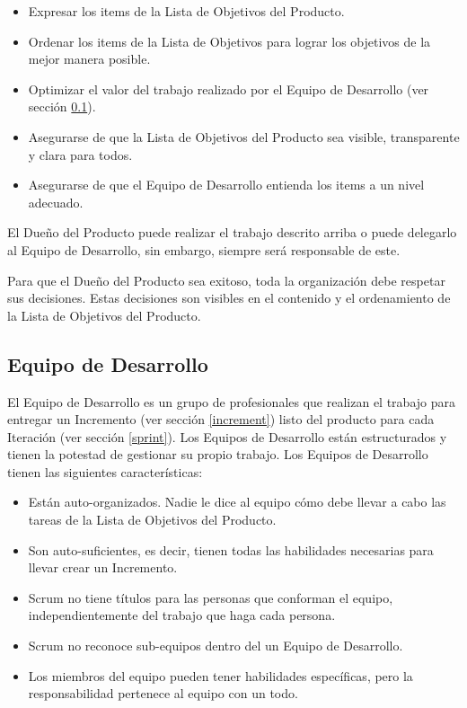 \begin{itemize}
    \item Expresar los items de la Lista de Objetivos del Producto.
    \item Ordenar los items de la Lista de Objetivos para lograr los objetivos de la mejor manera posible.
    \item Optimizar el valor del trabajo realizado por el Equipo de Desarrollo (ver sección \ref{developmentTeam}).
    \item Asegurarse de que la Lista de Objetivos del Producto sea visible, transparente y clara para todos.
    \item Asegurarse de que el Equipo de Desarrollo entienda los items a un nivel adecuado.
\end{itemize}

El Dueño del Producto puede realizar el trabajo descrito arriba o puede delegarlo al Equipo de Desarrollo, sin embargo, siempre será responsable de este.

Para que el Dueño del Producto sea exitoso, toda la organización debe respetar sus decisiones. Estas decisiones son visibles en el contenido y el ordenamiento de la Lista de Objetivos del Producto. \cite{scrumSchwaber}

\subsection{Equipo de Desarrollo} \label{developmentTeam}
El Equipo de Desarrollo es un grupo de profesionales que realizan el trabajo para entregar un Incremento (ver sección \ref{increment}) listo del producto para cada Iteración (ver sección \ref{sprint}). Los Equipos de Desarrollo están estructurados y tienen la potestad de gestionar su propio trabajo. Los Equipos de Desarrollo tienen las siguientes características:

\begin{itemize}
    \item Están auto-organizados. Nadie le dice al equipo cómo debe llevar a cabo las tareas de la Lista de Objetivos del Producto.
    \item Son auto-suficientes, es decir, tienen todas las habilidades necesarias para llevar crear un Incremento.
    \item Scrum no tiene títulos para las personas que conforman el equipo, independientemente del trabajo que haga cada persona.
    \item Scrum no reconoce sub-equipos dentro del un Equipo de Desarrollo.
    \item Los miembros del equipo pueden tener habilidades específicas, pero la responsabilidad pertenece al equipo con un todo. \cite{scrumSchwaber}
\end{itemize}

